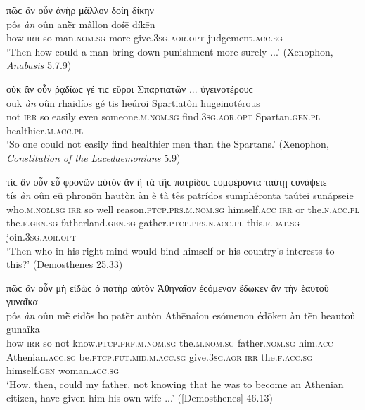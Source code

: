 \begin{exe}
\ex πῶϲ ἂν οὖν ἀνὴρ μᾶλλον δοίη δίκην\\
\gll pôs \emph{àn} oûn anḕr mâllon doíē díkēn\\
how \textsc{irr} so man.\textsc{nom.sg} more give.\textsc{3sg.aor.opt} judgement.\textsc{acc.sg}\\
\trans `Then how could a man bring down punishment more surely ...' (Xenophon, \textit{Anabasis} 5.7.9)
\label{displace8}
\end{exe}

\begin{exe}
\ex οὐκ ἂν οὖν ῥᾳδίωϲ γέ τιϲ εὕροι Σπαρτιατῶν ... ὑγεινοτέρουϲ\\
\gll ouk \emph{àn} oûn rhāidíōs gé tis heúroi Spartiatôn hugeinotérous\\
not \textsc{irr} so easily even someone.\textsc{m.nom.sg} find.\textsc{3sg.aor.opt} Spartan.\textsc{gen.pl} healthier.\textsc{m.acc.pl}\\
\trans `So one could not easily find healthier men than the Spartans.' (Xenophon, \textit{Constitution of the Lacedaemonians} 5.9)
\label{displace9}
\end{exe}

\begin{exe}
\ex τίϲ ἂν οὖν εὖ φρονῶν αὑτὸν ἂν ἢ τὰ τῆϲ πατρίδοϲ ϲυμφέροντα ταύτῃ ϲυνάψειε\\
\gll tís \emph{àn} oûn eû phronôn hautòn àn ḕ tà tês patrídos sumphéronta taútēi sunápseie\\
who.\textsc{m.nom.sg} \textsc{irr} so well reason.\textsc{ptcp.prs.m.nom.sg} himself.\textsc{acc} \textsc{irr} or the.\textsc{n.acc.pl} the.\textsc{f.gen.sg} fatherland.\textsc{gen.sg} gather.\textsc{ptcp.prs.n.acc.pl} this.\textsc{f.dat.sg} join.\textsc{3sg.aor.opt}\\
\trans `Then who in his right mind would bind himself or his country's interests to this?' (Demosthenes 25.33)
\label{displace10}
\end{exe}

\begin{exe}
\ex πῶϲ ἂν οὖν μὴ εἰδὼϲ ὁ πατὴρ αὐτὸν Ἀθηναῖον ἐϲόμενον ἔδωκεν ἂν τὴν ἑαυτοῦ γυναῖκα\\
\gll pôs \emph{àn} oûn mḕ eidṑs ho patḕr autòn Athēnaîon esómenon édōken àn tḕn heautoû gunaîka\\
how \textsc{irr} so not know.\textsc{ptcp.prf.m.nom.sg} the.\textsc{m.nom.sg} father.\textsc{nom.sg} him.\textsc{acc} Athenian.\textsc{acc.sg} be.\textsc{ptcp.fut.mid.m.acc.sg} give.\textsc{3sg.aor} \textsc{irr} the.\textsc{f.acc.sg} himself.\textsc{gen} woman.\textsc{acc.sg}\\
\trans `How, then, could my father, not knowing that he was to become an Athenian citizen, have given him his own wife ...' ({[}Demosthenes{]} 46.13)
\label{displace11}
\end{exe}

